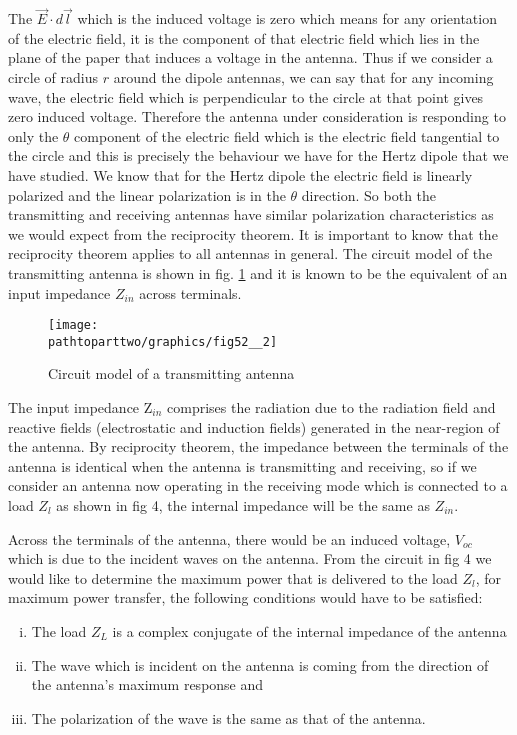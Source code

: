 The $\vec{E}\cdot d\vec{l}$ which is the induced voltage is zero which means for any orientation of the electric field, it is the component of that electric field which lies in the plane of the paper that induces a voltage in the antenna. Thus if we consider a circle of radius $r$ around the dipole antennas, we can say that for any incoming wave, the electric field which is perpendicular to the circle at that point gives zero induced voltage. Therefore the antenna under consideration is responding to only the $\theta$ component of the electric field which is the electric field tangential to the circle and this is precisely the behaviour we have for the Hertz dipole that we have studied. We know that for the Hertz dipole the electric field is linearly polarized and the linear polarization is in the $\theta$ direction. So both the transmitting and receiving antennas have similar polarization characteristics as we would expect from the reciprocity theorem. It is important to know that the reciprocity theorem applies to all antennas in general. The circuit model of the transmitting antenna is shown in fig. \ref{49.3} and it is known to be the equivalent of an input impedance $Z_{in}$ across terminals.
\begin{figure}[h]
\centering
\texttt{[image: \\pathtoparttwo/graphics/fig52\_\_2]}
\caption{Circuit model of a transmitting antenna}
\label{49.3}
\end{figure}

The input impedance Z$_{in}$  comprises the radiation due to the radiation field and reactive fields (electrostatic and induction fields) generated in the near-region of the antenna.
By reciprocity theorem, the impedance between the terminals of the antenna is identical when the antenna is transmitting and receiving, so if we consider an antenna now operating in the receiving mode which is connected to a load $Z_{l}$ as shown in fig 4, the internal impedance will be the same as $Z_{in}$.

Across the terminals of the antenna, there would be an induced voltage, $V_{oc}$ which is due to the incident waves on the antenna. From the circuit in fig 4 we would like to determine the maximum power that is delivered to the load $Z_{l}$, for maximum power transfer, the following conditions would have to be satisfied:
\begin{enumerate}[(i)]
\item The load $Z_{L}$ is a complex conjugate of the internal impedance of the antenna
\item The wave which is incident on the antenna is coming from the direction of the antenna's maximum response and
\item The polarization of the wave is the same as that of the antenna.
\end{enumerate}

